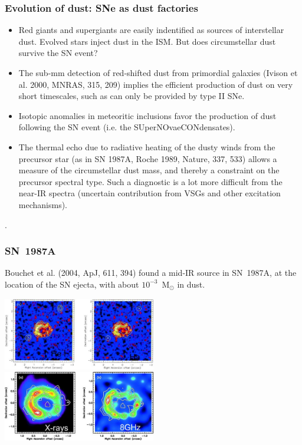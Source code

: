 \begin{frame}\frametitle{Evolution of dust:
SNe as dust factories}

\begin{itemize}
\item Red giants and supergiants are easily indentified as sources of
interstellar dust.  Evolved stars inject dust in the ISM.  But does
circumstellar dust survive the SN event?

\item The sub-mm detection of red-shifted dust from primordial
galaxies (Ivison et al. 2000, MNRAS, 315, 209) implies the efficient
production of dust on very short timescales, such as can only be
provided by type II SNe.


\item Isotopic anomalies in meteoritic inclusions favor the production
  of dust following the SN event (i.e. the SUperNOvaeCONdensates). 

\item The thermal echo due to radiative heating of the dusty winds
from the precursor star (as in SN 1987A, Roche 1989, Nature, 337, 533)
allows a measure of the circumstellar dust mass, and thereby a
constraint on the precursor spectral type. Such a diagnostic is a lot
more difficult from the near-IR spectra (uncertain contribution from
VSGs and other excitation mechanisms).

\end{itemize}.

\end{frame}
\begin{frame}\frametitle{SN~1987A}

Bouchet et al. (2004, ApJ, 611, 394) found a mid-IR source in
SN~1987A, at the location of the SN ejecta, with about
$10^{-3}$~M$_{\odot}$ in dust.
\vspace{-0.1cm}
\begin{center}
\includegraphics[width=0.5\textwidth,height=!]{./D/SN1987A_1.jpg}
\includegraphics[width=0.5\textwidth,height=!]{./D/SN1987A_2.jpg}
\end{center}
\vfill


\end{frame}
